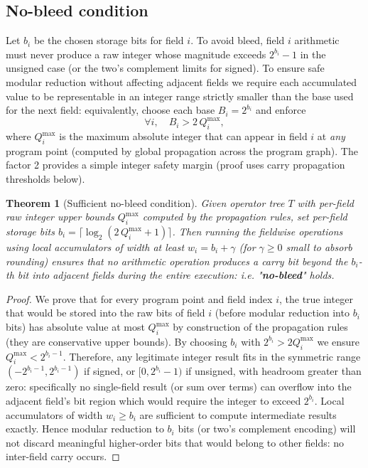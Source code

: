 \documentclass[11pt]{article}
\theoremstyle{definition}
\theoremstyle{plain}
\newtheorem{theorem}{Theorem}[section]
\begin{document}
\subsection{No-bleed condition}
Let \(b_i\) be the chosen storage bits for field \(i\). To avoid bleed, field \(i\) arithmetic must never produce a raw integer whose magnitude exceeds \(2^{b_i}-1\) in the unsigned case (or the two's complement limits for signed). To ensure safe modular reduction without affecting adjacent fields we require each accumulated value to be representable in an integer range strictly smaller than the base used for the next field: equivalently, choose each base \(B_i=2^{b_i}\) and enforce
\[
\forall i,\quad B_i > 2\, Q_i^{\text{max}},
\]
where \(Q_i^{\text{max}}\) is the maximum absolute integer that can appear in field \(i\) at \emph{any} program point (computed by global propagation across the program graph). The factor 2 provides a simple integer safety margin (proof uses carry propagation thresholds below).

\begin{theorem}[Sufficient no-bleed condition]\label{thm:nobleed}
Given operator tree \(T\) with per-field raw integer upper bounds \(Q_i^{\max}\) computed by the propagation rules, set per-field storage bits \(b_i = \lceil \log_2(2\, Q_i^{\max} + 1)\rceil\). Then running the fieldwise operations using local accumulators of width at least \(w_i = b_i + \gamma\) (for \(\gamma\ge 0\) small to absorb rounding) ensures that no arithmetic operation produces a carry bit beyond the \(b_i\)-th bit into adjacent fields during the entire execution: i.e. "\textbf{no-bleed}" holds.
\end{theorem}

\begin{proof}
We prove that for every program point and field index \(i\), the true integer that would be stored into the raw bits of field \(i\) (before modular reduction into \(b_i\) bits) has absolute value at most \(Q_i^{\max}\) by construction of the propagation rules (they are conservative upper bounds). By choosing \(b_i\) with \(2^{b_i} > 2 Q_i^{\max}\) we ensure \(Q_i^{\max} < 2^{b_i-1}\). Therefore, any legitimate integer result fits in the symmetric range \((-2^{b_i-1}, 2^{b_i-1})\) if signed, or \([0,2^{b_i}-1)\) if unsigned, with headroom greater than zero: specifically no single-field result (or sum over terms) can overflow into the adjacent field's bit region which would require the integer to exceed \(2^{b_i}\). Local accumulators of width \(w_i\ge b_i\) are sufficient to compute intermediate results exactly. Hence modular reduction to \(b_i\) bits (or two's complement encoding) will not discard meaningful higher-order bits that would belong to other fields: no inter-field carry occurs.
\end{proof}
\end{document}
